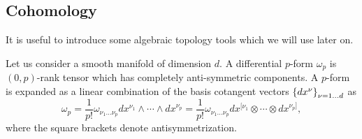 %
%
%
%
%
%

\subsection{Cohomology}

It is useful to introduce some algebraic topology tools which we will use later on.

Let us consider a smooth manifold of dimension $d$. A differential $p$-form $\omega_p$ is $(0,p)$-rank tensor which has completely anti-symmetric components.
A $p$-form is expanded as a linear combination of the basis cotangent vectors $\qty{dx^\nu}_{\nu=1\ldots d}$  as
\begin{equation}
  \omega_p =\frac{1}{p!} \omega_{\nu_1\ldots\nu_p}dx^{\nu_1}\wedge \cdots  \wedge dx^{\nu_p} =
\frac{1}{p!} \omega_{\nu_1\ldots\nu_p}dx^{[ \nu_1}\otimes \cdots  \otimes dx^{\nu_p]},
\end{equation}
where the square brackets denote antisymmetrization.

